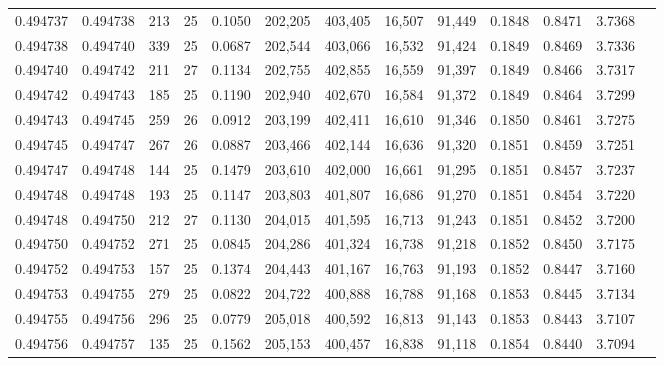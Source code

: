 \begin{tabular}{rrrrrrrrrrrrr}
0.494737 & 0.494738 & 213 &  25 &                                     0.1050 & 202,205 & 403,405 &  16,507 &  91,449 & 0.1848 & 0.8471 & 3.7368 \\
0.494738 & 0.494740 & 339 &  25 &                                     0.0687 & 202,544 & 403,066 &  16,532 &  91,424 & 0.1849 & 0.8469 & 3.7336 \\
0.494740 & 0.494742 & 211 &  27 &                                     0.1134 & 202,755 & 402,855 &  16,559 &  91,397 & 0.1849 & 0.8466 & 3.7317 \\
0.494742 & 0.494743 & 185 &  25 &                                     0.1190 & 202,940 & 402,670 &  16,584 &  91,372 & 0.1849 & 0.8464 & 3.7299 \\
0.494743 & 0.494745 & 259 &  26 &                                     0.0912 & 203,199 & 402,411 &  16,610 &  91,346 & 0.1850 & 0.8461 & 3.7275 \\
0.494745 & 0.494747 & 267 &  26 &                                     0.0887 & 203,466 & 402,144 &  16,636 &  91,320 & 0.1851 & 0.8459 & 3.7251 \\
0.494747 & 0.494748 & 144 &  25 &                                     0.1479 & 203,610 & 402,000 &  16,661 &  91,295 & 0.1851 & 0.8457 & 3.7237 \\
0.494748 & 0.494748 & 193 &  25 &                                     0.1147 & 203,803 & 401,807 &  16,686 &  91,270 & 0.1851 & 0.8454 & 3.7220 \\
0.494748 & 0.494750 & 212 &  27 &                                     0.1130 & 204,015 & 401,595 &  16,713 &  91,243 & 0.1851 & 0.8452 & 3.7200 \\
0.494750 & 0.494752 & 271 &  25 &                                     0.0845 & 204,286 & 401,324 &  16,738 &  91,218 & 0.1852 & 0.8450 & 3.7175 \\
0.494752 & 0.494753 & 157 &  25 &                                     0.1374 & 204,443 & 401,167 &  16,763 &  91,193 & 0.1852 & 0.8447 & 3.7160 \\
0.494753 & 0.494755 & 279 &  25 &                                     0.0822 & 204,722 & 400,888 &  16,788 &  91,168 & 0.1853 & 0.8445 & 3.7134 \\
0.494755 & 0.494756 & 296 &  25 &                                     0.0779 & 205,018 & 400,592 &  16,813 &  91,143 & 0.1853 & 0.8443 & 3.7107 \\
0.494756 & 0.494757 & 135 &  25 &                                     0.1562 & 205,153 & 400,457 &  16,838 &  91,118 & 0.1854 & 0.8440 & 3.7094 \\

\end{tabular}
